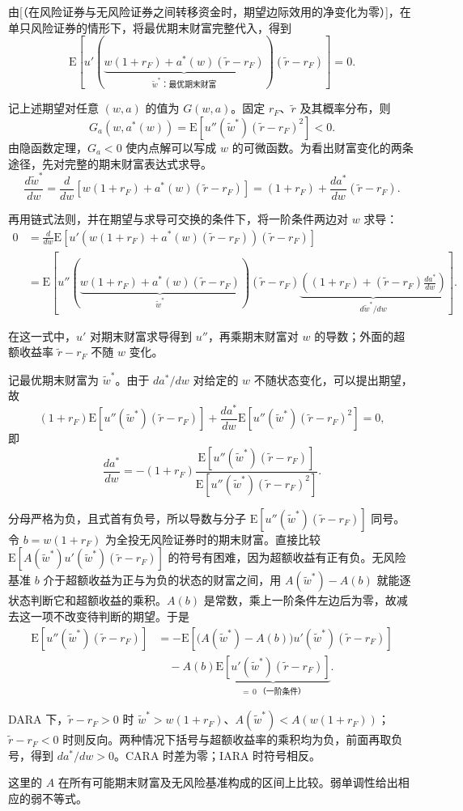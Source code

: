 \begin{solution}[label-content={证明},blank-type=none]
由[（在风险证券与无风险证券之间转移资金时，期望边际效用的净变化为零）]，在单只风险证券的情形下，将最优期末财富完整代入，得到
\[
 \mathrm E\!\left[
 u'\!\left(\underbrace{w(1+r_F)+a^*(w)(\tilde r-r_F)}_{\tilde w^*\text{：最优期末财富}}\right)
 (\tilde r-r_F)\right]=0.
\]

记上述期望对任意 $(w,a)$ 的值为 $G(w,a)$。固定 $r_F$、$\tilde r$ 及其概率分布，则
\[
 G_a(w,a^*(w))=\mathrm E[u''(\tilde w^*)(\tilde r-r_F)^2]<0.
\]
由隐函数定理，$G_a<0$ 使内点解可以写成 $w$ 的可微函数。为看出财富变化的两条途径，先对完整的期末财富表达式求导。
\[
 \frac{d\tilde w^*}{dw}
 =\frac{d}{dw}\left[w(1+r_F)+a^*(w)(\tilde r-r_F)\right]
 =(1+r_F)+\frac{da^*}{dw}(\tilde r-r_F).
\]

再用链式法则，并在期望与求导可交换的条件下，将一阶条件两边对 $w$ 求导：
\[
\begin{aligned}
 0&=\frac{d}{dw}\mathrm E\!\left[
 u'\!\left(w(1+r_F)+a^*(w)(\tilde r-r_F)\right)(\tilde r-r_F)\right]\\
 &=\mathrm E\!\left[
 u''\!\left(\underbrace{w(1+r_F)+a^*(w)(\tilde r-r_F)}_{\tilde w^*}\right)
 (\tilde r-r_F)
 \underbrace{\left((1+r_F)+(\tilde r-r_F)\frac{da^*}{dw}\right)}_{d\tilde w^*/dw}
 \right].
\end{aligned}
\]

在这一式中，$u'$ 对期末财富求导得到 $u''$，再乘期末财富对 $w$ 的导数；外面的超额收益率 $\tilde r-r_F$ 不随 $w$ 变化。

记最优期末财富为 $\tilde w^*$。由于 $da^*/dw$ 对给定的 $w$ 不随状态变化，可以提出期望，故
\[
 (1+r_F)\mathrm E[u''(\tilde w^*)(\tilde r-r_F)]
 +\frac{da^*}{dw}\mathrm E[u''(\tilde w^*)(\tilde r-r_F)^2]=0,
\]
即
\[
 \frac{da^*}{dw}=-(1+r_F)
 \frac{\mathrm E[u''(\tilde w^*)(\tilde r-r_F)]}
      {\mathrm E[u''(\tilde w^*)(\tilde r-r_F)^2]}.
\]

分母严格为负，且式首有负号，所以导数与分子 $\mathrm E[u''(\tilde w^*)(\tilde r-r_F)]$ 同号。令 $b=w(1+r_F)$ 为全投无风险证券时的期末财富。直接比较 $\mathrm E[A(\tilde w^*)u'(\tilde w^*)(\tilde r-r_F)]$ 的符号有困难，因为超额收益有正有负。无风险基准 $b$ 介于超额收益为正与为负的状态的财富之间，用 $A(\tilde w^*)-A(b)$ 就能逐状态判断它和超额收益的乘积。$A(b)$ 是常数，乘上一阶条件左边后为零，故减去这一项不改变待判断的期望。于是
\[
\begin{aligned}
 \mathrm E[u''(\tilde w^*)(\tilde r-r_F)]
 &=-\mathrm E\!\left[
 \bigl(A(\tilde w^*)-A(b)\bigr)
 u'(\tilde w^*)(\tilde r-r_F)\right]\\
 &\quad{}-A(b)\underbrace{\mathrm E[u'(\tilde w^*)(\tilde r-r_F)]}
 _{=\,0\ \text{（一阶条件）}}.
\end{aligned}
\]

DARA 下，$\tilde r-r_F>0$ 时 $\tilde w^*>w(1+r_F)$、$A(\tilde w^*)<A(w(1+r_F))$；$\tilde r-r_F<0$ 时则反向。两种情况下括号与超额收益率的乘积均为负，前面再取负号，得到 $da^*/dw>0$。CARA 时差为零；IARA 时符号相反。

这里的 $A$ 在所有可能期末财富及无风险基准构成的区间上比较。弱单调性给出相应的弱不等式。
\end{solution}

